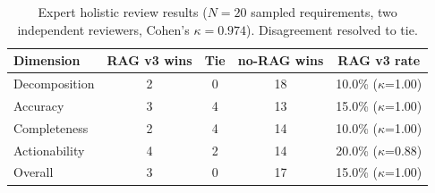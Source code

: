 \begin{table}[H]
\caption{Expert holistic review results ($N=20$ sampled requirements, two independent reviewers, Cohen's $\kappa=0.974$). Disagreement resolved to tie.}
\label{tab:expert_review}
\begin{tabular}{lcccc}
\toprule
\textbf{Dimension} & \textbf{RAG v3 wins} & \textbf{Tie} & \textbf{no-RAG wins} & \textbf{RAG v3 rate} \\
\midrule
Decomposition & 2 & 0 & 18 & 10.0\% ($\kappa$=1.00) \\
Accuracy & 3 & 4 & 13 & 15.0\% ($\kappa$=1.00) \\
Completeness & 2 & 4 & 14 & 10.0\% ($\kappa$=1.00) \\
Actionability & 4 & 2 & 14 & 20.0\% ($\kappa$=0.88) \\
Overall & 3 & 0 & 17 & 15.0\% ($\kappa$=1.00) \\
\bottomrule
\end{tabular}
\end{table}